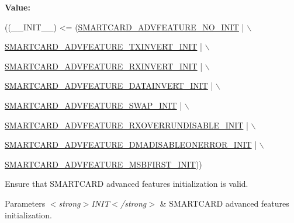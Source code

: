 {\bfseries Value\+:}
\begin{DoxyCode}
((\_\_INIT\_\_) <= (\hyperlink{group___s_m_a_r_t_c_a_r_d___advanced___features___initialization___type_ga3f50610506f090ecb288def5c41014ee}{SMARTCARD\_ADVFEATURE\_NO\_INIT}                | \(\backslash\)
                                                               
      \hyperlink{group___s_m_a_r_t_c_a_r_d___advanced___features___initialization___type_ga794f7b0774e3154b9f31228f3a33ac49}{SMARTCARD\_ADVFEATURE\_TXINVERT\_INIT}          | \(\backslash\)
                                                               
      \hyperlink{group___s_m_a_r_t_c_a_r_d___advanced___features___initialization___type_gaa7e8ed8f475a691477e34b716c21237d}{SMARTCARD\_ADVFEATURE\_RXINVERT\_INIT}          | \(\backslash\)
                                                               
      \hyperlink{group___s_m_a_r_t_c_a_r_d___advanced___features___initialization___type_gaff9179536e899cd05fc0bc073d2de4de}{SMARTCARD\_ADVFEATURE\_DATAINVERT\_INIT}        | \(\backslash\)
                                                               
      \hyperlink{group___s_m_a_r_t_c_a_r_d___advanced___features___initialization___type_ga2b31d5e827e311a620a03d7ac369e3f1}{SMARTCARD\_ADVFEATURE\_SWAP\_INIT}              | \(\backslash\)
                                                               
      \hyperlink{group___s_m_a_r_t_c_a_r_d___advanced___features___initialization___type_gad8481647df6a6e63f98396bcd1077131}{SMARTCARD\_ADVFEATURE\_RXOVERRUNDISABLE\_INIT}  | \(\backslash\)
                                                               
      \hyperlink{group___s_m_a_r_t_c_a_r_d___advanced___features___initialization___type_ga4d119df3c42949a2af040a0dbde5b433}{SMARTCARD\_ADVFEATURE\_DMADISABLEONERROR\_INIT} | \(\backslash\)
                                                               
      \hyperlink{group___s_m_a_r_t_c_a_r_d___advanced___features___initialization___type_ga75b789c3345aa6e8e05494e1f2b2f766}{SMARTCARD\_ADVFEATURE\_MSBFIRST\_INIT}))
\end{DoxyCode}


Ensure that S\+M\+A\+R\+T\+C\+A\+RD advanced features initialization is valid. 


\begin{DoxyParams}{Parameters}
{\em $<$strong$>$\+I\+N\+I\+T$<$/strong$>$} & S\+M\+A\+R\+T\+C\+A\+RD advanced features initialization. \\
\hline
\end{DoxyParams}

